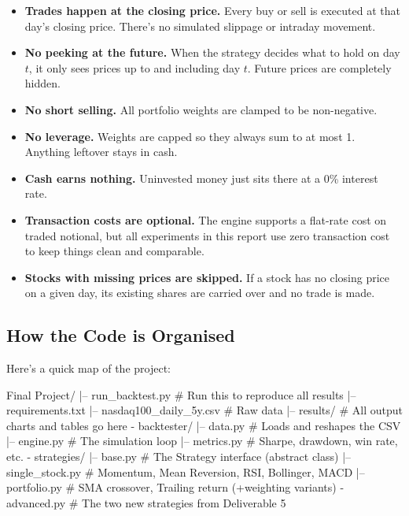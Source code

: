 \documentclass[11pt,a4paper]{article}
\begin{document}
\begin{itemize}[leftmargin=*]
    \item \textbf{Trades happen at the closing price.}
          Every buy or sell is executed at that day's closing price.
          There's no simulated slippage or intraday movement.

    \item \textbf{No peeking at the future.}
          When the strategy decides what to hold on day $t$, it only sees prices
          up to and including day $t$. Future prices are completely hidden.

    \item \textbf{No short selling.}
          All portfolio weights are clamped to be non-negative.

    \item \textbf{No leverage.}
          Weights are capped so they always sum to at most 1.
          Anything leftover stays in cash.

    \item \textbf{Cash earns nothing.}
          Uninvested money just sits there at a 0\% interest rate.

    \item \textbf{Transaction costs are optional.}
          The engine supports a flat-rate cost on traded notional,
          but all experiments in this report use zero transaction cost
          to keep things clean and comparable.

    \item \textbf{Stocks with missing prices are skipped.}
          If a stock has no closing price on a given day, its existing shares
          are carried over and no trade is made.
\end{itemize}

\subsection{How the Code is Organised}

Here's a quick map of the project:

\begin{codeblock}
Final Project/
|-- run_backtest.py               # Run this to reproduce all results
|-- requirements.txt
|-- nasdaq100_daily_5y.csv        # Raw data
|-- results/                      # All output charts and tables go here
\-- backtester/
    |-- data.py                   # Loads and reshapes the CSV
    |-- engine.py                 # The simulation loop
    |-- metrics.py                # Sharpe, drawdown, win rate, etc.
    \-- strategies/
        |-- base.py               # The Strategy interface (abstract class)
        |-- single_stock.py       # Momentum, Mean Reversion, RSI, Bollinger, MACD
        |-- portfolio.py          # SMA crossover, Trailing return (+weighting variants)
        \-- advanced.py           # The two new strategies from Deliverable 5
\end{codeblock}
\end{document}
